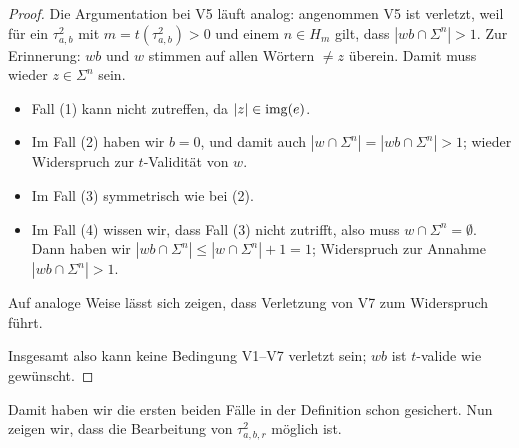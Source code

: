 \begin{proof}
    Die Argumentation bei V5 läuft analog:
    angenommen V5 ist verletzt, weil für ein $\tau^2_{a,b}$ mit $m=t(\tau^2_{a,b})>0$ und einem $n\in H_m$ gilt, dass $|wb\cap\Sigma^n|> 1$.
    Zur Erinnerung: $wb$ und $w$ stimmen auf allen Wörtern $\neq z$ überein.
    Damit muss wieder $z\in\Sigma^n$ sein.
    \begin{itemize}[nosep]
        \item Fall (1) kann nicht zutreffen, da $|z|\in\operatorname{img}(e)$.
        \item Im Fall (2) haben wir $b=0$, und damit auch $|w\cap\Sigma^n|=|wb\cap\Sigma^n|>1$; wieder Widerspruch zur $t$-Validität von $w$.
        \item Im Fall (3) symmetrisch wie bei (2).
        \item Im Fall (4) wissen wir, dass Fall (3) nicht zutrifft, also muss $w\cap\Sigma^n=\emptyset$.
            Dann haben wir $|wb\cap\Sigma^n|\leq |w\cap\Sigma^n|+1 = 1$; Widerspruch zur Annahme $|wb\cap\Sigma^n|> 1$.
    \end{itemize}
    Auf analoge Weise lässt sich zeigen, dass Verletzung von V7 zum Widerspruch führt.

    Insgesamt also kann keine Bedingung V1--V7 verletzt sein; $wb$ ist $t$-valide wie gewünscht.
\end{proof}

Damit haben wir die ersten beiden Fälle in der Definition schon gesichert. Nun zeigen wir, dass die Bearbeitung von $\tau^2_{a,b,r}$ möglich ist.

